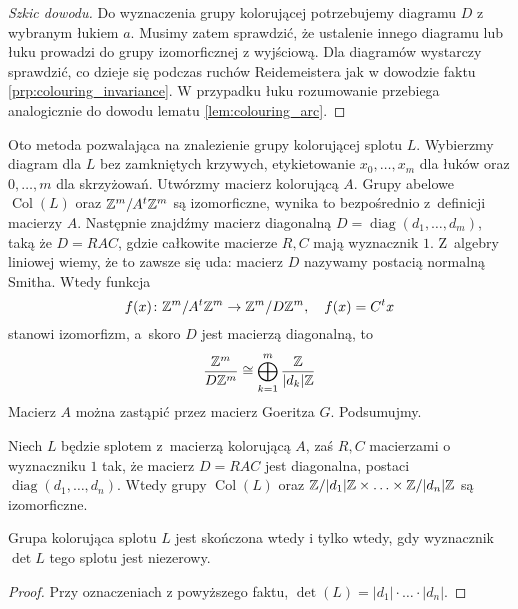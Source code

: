 \begin{proof}[Szkic dowodu]
    Do wyznaczenia grupy kolorującej potrzebujemy diagramu $D$ z wybranym łukiem $a$.
    Musimy zatem sprawdzić, że ustalenie innego diagramu lub łuku prowadzi do grupy izomorficznej z wyjściową.
    Dla diagramów wystarczy sprawdzić, co dzieje się podczas ruchów Reidemeistera jak w dowodzie faktu \ref{prp:colouring_invariance}.
    W przypadku łuku rozumowanie przebiega analogicznie do dowodu lematu \ref{lem:colouring_arc}.
\end{proof}

Oto metoda pozwalająca na znalezienie grupy kolorującej splotu $L$.
Wybierzmy diagram dla $L$ bez zamkniętych krzywych, etykietowanie $x_0, \ldots, x_m$ dla łuków oraz $0, \ldots, m$ dla skrzyżowań.
Utwórzmy macierz kolorującą $A$.
Grupy abelowe $\operatorname{Col}(L)$ oraz $\mathbb Z^m / A^t \mathbb Z^m$ są izomorficzne, wynika to bezpośrednio z~definicji macierzy $A$.
Następnie znajdźmy macierz diagonalną $D = \operatorname{diag}(d_1, \ldots, d_m)$, taką że $D = RAC$, gdzie całkowite macierze $R, C$ mają wyznacznik $1$.
Z~algebry liniowej wiemy, że to zawsze się uda: macierz $D$ nazywamy postacią normalną Smitha.
Wtedy funkcja
\begin{equation}
    f(x) \colon \mathbb Z^m/A^t \mathbb Z^m \to \mathbb Z^m / D\mathbb Z^m, \quad f(x) = C^t x
\end{equation}
stanowi izomorfizm, a~skoro $D$ jest macierzą diagonalną, to
\begin{equation}
    \frac{\mathbb Z^m}{D\mathbb Z^m} \cong \bigoplus_{k=1}^m \frac{\mathbb Z}{|d_k| \mathbb Z}
\end{equation}
Macierz $A$ można zastąpić przez macierz Goeritza $G$.
Podsumujmy.

\begin{proposition}
    Niech $L$ będzie splotem z~macierzą kolorującą $A$, zaś $R, C$ macierzami o wyznaczniku $1$ tak, że macierz $D=RAC$ jest diagonalna, postaci $\operatorname{diag}(d_1, \ldots, d_n)$.
    Wtedy grupy $\operatorname{Col}(L)$ oraz $\mathbb Z/|d_1| \mathbb Z \times \ldots \times \mathbb Z/|d_n| \mathbb Z$ są izomorficzne.
\end{proposition}

\begin{corollary}
    Grupa kolorująca splotu $L$ jest skończona wtedy i tylko wtedy, gdy wyznacznik $\det L$ tego splotu jest niezerowy.
\end{corollary}

\begin{proof}
    Przy oznaczeniach z powyższego faktu, $\det(L) = |d_1| \cdot \ldots \cdot |d_n|$.
\end{proof}


